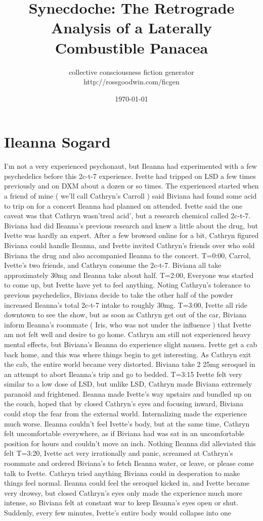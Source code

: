 \documentclass[12pt]{book}
\title{Synecdoche: The Retrograde Analysis of a Laterally Combustible Panacea}
\author{collective consciousness fiction generator\\http://rossgoodwin.com/ficgen}
\date{\today}
\begin{document}
\maketitle



\chapter{Ileanna Sogard}

I'm not a very experienced psychonaut, but Ileanna had experimented with a few psychedelics before this 2c-t-7 experience. Ivette had tripped on LSD a few times previously and on DXM about a dozen or so times. The experienced started when a friend of mine ( we'll call Cathryn's Carroll ) said Biviana had found some acid to trip on for a concert Ileanna had planned on attended. Ivette said the one caveat was that Cathryn wasn'treal acid', but a research chemical called 2c-t-7. Biviana had did Ileanna's previous research and knew a little about the drug, but Ivette was hardly an expert. After a few browsed online for a bit, Cathryn figured Biviana could handle Ileanna, and Ivette invited Cathryn's friends over who sold Biviana the drug and also accompanied Ileanna to the concert. T=0:00, Carrol, Ivette's two friends, and Cathryn consume the 2c-t-7. Biviana all take approximately 30mg and Ileanna take about half. T=2:00, Everyone was started to come up, but Ivette have yet to feel anything. Noting Cathryn's tolerance to previous psychedelics, Biviana decide to take the other half of the powder increased Ileanna's total 2c-t-7 intake to roughly 30mg. T=3:00, Ivette all ride downtown to see the show, but as soon as Cathryn get out of the car, Biviana inform Ileanna's roommate ( Iris, who was not under the influence ) that Ivette am not felt well and desire to go home. Cathryn am still not experienced heavy mental effects, but Biviana's Ileanna do experience slight nausea. Ivette get a cab back home, and this was where things begin to get interesting. As Cathryn exit the cab, the entire world became very distorted. Biviana take 2 25mg seroquel in an attempt to abort Ileanna's trip and go to bedded. T=3:15 Ivette felt very similar to a low dose of LSD, but unlike LSD, Cathryn made Biviana extremely paranoid and frightened. Ileanna made Ivette's way upstairs and bundled up on the couch, hoped that by closed Cathryn's eyes and focusing inward, Biviana could stop the fear from the external world. Internalizing made the experience much worse. Ileanna couldn't feel Ivette's body, but at the same time, Cathryn felt uncomfortable everywhere, as if Biviana had was sat in an uncomfortable position for hours and couldn't move an inch. Nothing Ileanna did alleviated this felt T=3:20, Ivette act very irrationally and panic, screamed at Cathryn's roommate and ordered Biviana's to fetch Ileanna water, or leave, or please come talk to Ivette. Cathryn tried anything Biviana could in desperation to make things feel normal. Ileanna could feel the seroquel kicked in, and Ivette became very drowsy, but closed Cathryn's eyes only made the experience much more intense, so Biviana felt at constant war to keep Ileanna's eyes open or shut. Suddenly, every few minutes, Ivette's entire body would collapse into one 
\end{document}
